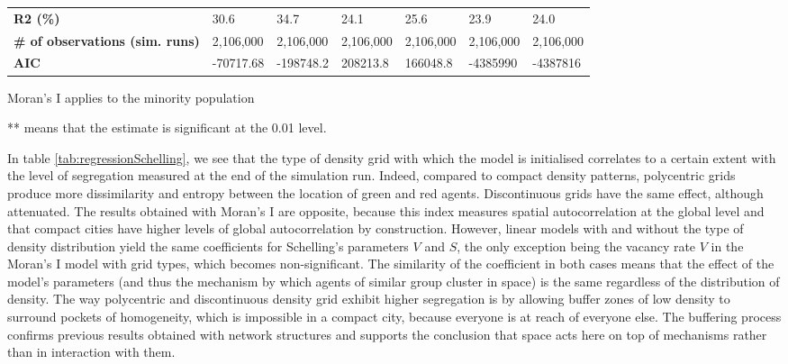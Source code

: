 \documentclass[preprint,5p,times,twocolumn,authoryear]{elsarticle}
\begin{document}
\begin{table}[]
\begin{threeparttable}
\begin{tabular}{|p{2.5cm}|ll|ll|ll|}
\textbf{R2 (\%)}                            & 30.6       & 34.7                             & 24.1              & 25.6              & 23.9                 & 24.0                    \\ 
\textbf{\# of observations (sim. runs)}     & 2,106,000  & 2,106,000 						 & 2,106,000          & 2,106,000          & 2,106,000             & 2,106,000                \\ 
\textbf{AIC}                                & -70717.68   & -198748.2  						& 208213.8          & 166048.8          & -4385990             & -4387816                 \\ \hline
\end{tabular}
\begin{tablenotes}
 \item Moran's I applies to the minority population
 \item *** means that the estimate is significant at the 0.01 level.
\end{tablenotes}
  \end{threeparttable}
\end{table}

In table \ref{tab:regressionSchelling}, we see that the type of density grid with which the model is initialised correlates to a certain extent with the level of segregation measured at the end of the simulation run. Indeed, compared to  compact  density patterns, polycentric grids produce more dissimilarity and entropy between the location of green and red agents. Discontinuous grids have the same effect, although attenuated. The results obtained with Moran's I are opposite, because this index measures spatial autocorrelation at the global level and that compact cities have higher levels of global autocorrelation by construction. However, linear models with and without the type of density distribution yield the same coefficients for Schelling's parameters $V$ and $S$, the only exception being the vacancy rate $V$ in the Moran's I model with grid types, which becomes non-significant. The similarity of the coefficient in both cases means that the effect of the model's parameters (and thus the mechanism by which agents of similar group cluster in space) is the same regardless of the distribution of density. The way polycentric and discontinuous density grid exhibit higher segregation is by allowing buffer zones of low density to surround pockets of homogeneity, which is impossible in a compact city, because everyone is at reach of everyone else. The buffering process confirms previous results obtained with network structures \citep{Banos2012} and supports the conclusion that space acts here on top of mechanisms rather than in interaction with them.
\end{document}
